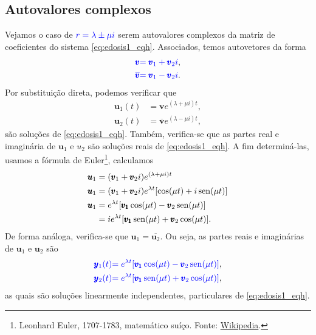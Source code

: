 \subsection{Autovalores complexos}

Vejamos o caso de ${\color{blue}r=\lambda  \pm \mu i}$ serem autovalores complexos da matriz de coeficientes do sistema \eqref{eq:edosis1_eqh}. Associados, temos autovetores da forma
\begin{align}
  {\color{blue}\pmb{v}} &{\color{blue}= \pmb{v}_1 + \pmb{v}_2i},\\
  {\color{blue}\overline{\pmb{v}}} &{\color{blue}= \pmb{v}_1 - \pmb{v}_2i}.
\end{align}
Por substituição direta, podemos verificar que
\begin{align}
  \pmb{u}_1(t) &= \pmb{v}e^{(\lambda + \mu i)t},\\
  \pmb{u}_2(t) &= \overline{\pmb{v}}e^{(\lambda - \mu i)t},
\end{align}
são soluções de \eqref{eq:edosis1_eqh}. Também, verifica-se que as partes real e imaginária de $\pmb{u}_1$ e ${u}_2$ são soluções reais de \eqref{eq:edosis1_eqh}. A fim determiná-las, usamos a fórmula de Euler\footnote{Leonhard Euler, 1707-1783, matemático suíço. Fonte: \href{https://en.wikipedia.org/wiki/Leonhard_Euler}{Wikipedia}.}, calculamos
\begin{align}
  \pmb{u}_1 &= (\pmb{v}_1 + \pmb{v}_2i)e^{(\lambda + \mu i)t} \\
  \pmb{u}_1 &= (\pmb{v}_1 + \pmb{v}_2i)e^{\lambda t}[\cos(\mu t) + i\operatorname{sen}(\mu t)] \\
  \pmb{u}_1 &= e^{\lambda t}[\pmb{v_1}\cos(\mu t)-\pmb{v}_2\operatorname{sen}(\mu t)] \\
            &= ie^{\lambda t}[\pmb{v_1}\operatorname{sen}(\mu t) + \pmb{v}_2\cos(\mu t)].
\end{align}
De forma análoga, verifica-se que $\pmb{u}_1 = \overline{\pmb{u}_2}$. Ou seja, as partes reais e imaginárias de $\pmb{u}_1$ e $\pmb{u}_2$ são
\begin{align}
  {\color{blue}\pmb{y}_1(t)} &{\color{blue}= e^{\lambda t}[\pmb{v_1}\cos(\mu t)-\pmb{v}_2\operatorname{sen}(\mu t)]}, \\
  {\color{blue}\pmb{y}_2(t)} &{\color{blue}= e^{\lambda t}[\pmb{v_1}\operatorname{sen}(\mu t)+\pmb{v}_2\cos(\mu t)]},
\end{align}
as quais são soluções linearmente independentes, particulares de \eqref{eq:edosis1_eqh}.

